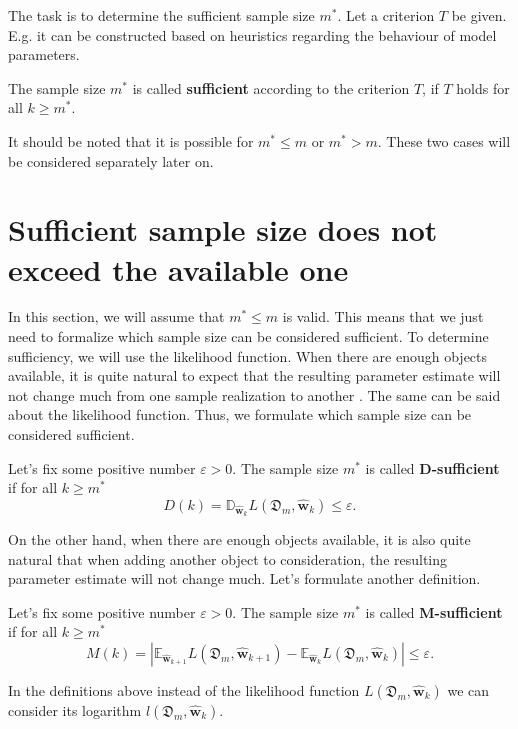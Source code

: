 \documentclass[
11pt,%
tightenlines,%
twoside,%
onecolumn,%
nofloats,%
nobibnotes,%
nofootinbib,%
superscriptaddress,%
noshowpacs,%
centertags]%
{revtex4-2}
\begin{document}
The task is to determine the sufficient sample size $m^*$. Let a criterion $T$ be given. E.g. it can be constructed based on heuristics regarding the behaviour of model parameters.
\begin{definition}
    The sample size $m^*$ is called \textbf{sufficient} according to the criterion $T$, if $T$ holds for all $k \geqslant m^*$.
\end{definition}
It should be noted that it is possible for $m^* \leqslant m$ or $m^* > m$. These two cases will be considered separately later on.

\section{Sufficient sample size does not exceed the available one}\label{sec2}

In this section, we will assume that $m^*\leqslant m$ is valid. This means that we just need to formalize which sample size can be considered sufficient. To determine sufficiency, we will use the likelihood function. When there are enough objects available, it is quite natural to expect that the resulting parameter estimate will not change much from one sample realization to another \cite{Joseph1997, Joseph1995}. The same can be said about the likelihood function. Thus, we formulate which sample size can be considered sufficient.

\begin{definition}
    \label{sufficient-variance}
    Let's fix some positive number $\varepsilon > 0$. The sample size $m^*$ is called \textbf{D-sufficient} if for all $k\geqslant m^*$
    \[ D(k) = \mathbb{D}_{\hat{\mathbf{w}}_{k}} L(\mathfrak{D}_m, \hat{\mathbf{w}}_{k}) \leqslant \varepsilon. \]
\end{definition}

On the other hand, when there are enough objects available, it is also quite natural that when adding another object to consideration, the resulting parameter estimate will not change much. Let's formulate another definition.

\begin{definition}
    \label{sufficient-difference}
    Let's fix some positive number $\varepsilon > 0$. The sample size $m^*$ is called \textbf{M-sufficient} if for all $k\geqslant m^*$ 
    \[ M(k) = \left| \mathbb{E}_{\hat{\mathbf{w}}_{k+1}} L(\mathfrak{D}_m, \hat{\mathbf{w}}_{k+1}) - \mathbb{E}_{\hat{\mathbf{w}}_{k}} L(\mathfrak{D}_m, \hat{\mathbf{w}}_{k}) \right| \leqslant \varepsilon. \]
\end{definition}
In the definitions above instead of the likelihood function $L(\mathfrak{D}_m, \hat{\mathbf{w}}_{k})$ we can consider its logarithm $l(\mathfrak{D}_m, \hat{\mathbf{w}}_{k})$.
\end{document}
